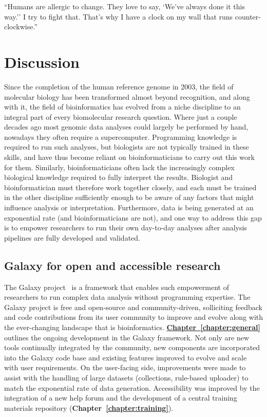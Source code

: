\begin{savequote}[75mm]
``Humans are allergic to change. They love to say, `We've always done it this way.'' I try to fight that. That's why I have a clock on my wall that runs counter-clockwise.''
\end{savequote}

\chapter{Discussion}\label{discussion}
\setcounter{figure}{-1}
\setcounter{table}{-1}
\setcounter{section}{-1}
\setcounter{NAT@ctr}{-1}

Since the completion of the human reference genome in 2003, the field of molecular biology has been transformed almost beyond recognition, and along with it, the field of bioinformatics has evolved from a niche discipline to an integral part of every biomolecular research question. Where just a couple decades ago most genomic data analyses could largely be performed by hand, nowadays they often require a supercomputer. Programming knowledge is required to run such analyses, but biologists are not typically trained in these skills, and have thus become reliant on bioinformaticians to carry out this work for them. Similarly, bioinformaticians often lack the increasingly complex biological knowledge required to fully interpret the results. Biologist and bioinformatician must therefore work together closely, and each must be trained in the other discipline sufficiently enough to be aware of any factors that might influence analysis or interpretation. Furthermore, data is being generated at an exponential rate (and bioinformaticians are not), and one way to address this gap is to empower researchers to run their own day-to-day analyses after analysis pipelines are fully developed and validated.


\section{Galaxy for open and accessible research}
The Galaxy project~\cite{TODO} is a framework that enables such empowerment of researchers to run complex data analysis without programming expertise. The Galaxy project is free and open-source and community-driven, solliciting feedback and code contributions from its user community to improve and evolve along with the ever-changing landscape that is bioinformatics. \hyperref[chapter:galaxy]{\textbf{Chapter~\ref{chapter:general}}} outlines the ongoing development in the Galaxy framework. Not only are new tools continually integrated by the community, new components are incorporated into the Galaxy code base and existing features improved to evolve and scale with user requirements. On the user-facing side, improvements were made to assist with the handling of large datasets (collections, rule-based uploader) to match the exponential rate of data generation. Accessibility was improved by the integration of a new help forum and the development of a central training materials repository (\textbf{Chapter~\ref{chapter:training}}).


